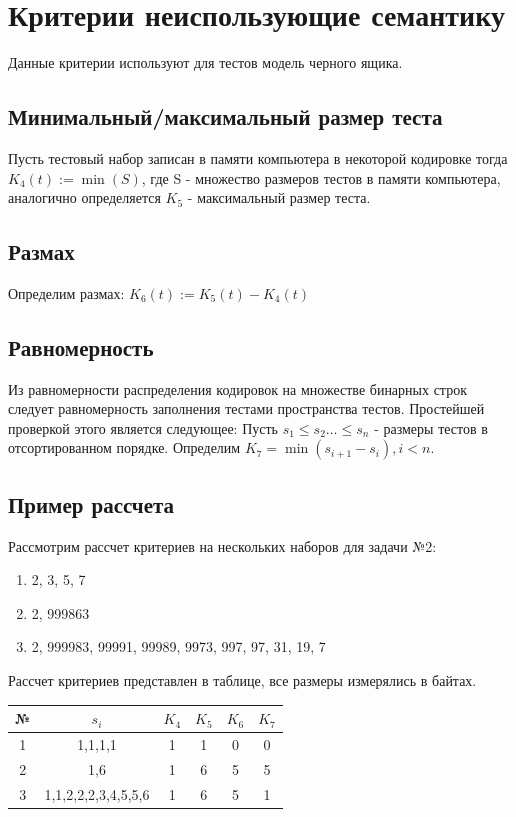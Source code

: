 \documentclass{article}
\begin{document}
\section{Критерии неиспользующие семантику}
    Данные критерии используют для тестов модель черного ящика.
\subsection{Минимальный/максимальный размер теста}
    Пусть тестовый набор записан в памяти компьютера в некоторой кодировке тогда 
    \(K_4(t) := \min(S) \), где S - множество размеров тестов в памяти компьютера,
     аналогично определяется \(K_5\) - максимальный размер теста.
\subsection{Размах}
    Определим размах: \(K_6(t) := K_5(t) - K_4(t)\)
\subsection{Равномерность}
    Из равномерности распределения кодировок на множестве бинарных строк
    следует равномерность заполнения тестами пространства тестов. Простейшей проверкой этого является следующее:
    Пусть \(s_1 \leq s_2 \ldots \leq s_n \) - размеры тестов в отсортированном порядке. 
    Определим \(K_7 = \min(s_{i + 1} - s_i), i < n\).
\subsection{Пример рассчета}
    Рассмотрим рассчет критериев на нескольких наборов для задачи №2:
\begin{enumerate}
\item 2, 3, 5, 7
\item 2, 999863
\item 2, 999983, 99991, 99989, 9973, 997, 97, 31, 19, 7
\end{enumerate}
    Рассчет критериев представлен в таблице, все размеры измерялись в байтах.

\begin{tabular}{|c|c|c|c|c|c|}
\hline
№ & \(s_i\) & \( K_4 \) & \( K_5 \) & \( K_6 \) & \( K_7 \) \\
\hline
1 & 1,1,1,1 & 1 & 1 & 0 & 0 \\
\hline
2 & 1,6 & 1 & 6 & 5 & 5\\
\hline
3 & 1,1,2,2,2,3,4,5,5,6 & 1 & 6 & 5& 1 \\
\hline
\end{tabular}
\end{document}
